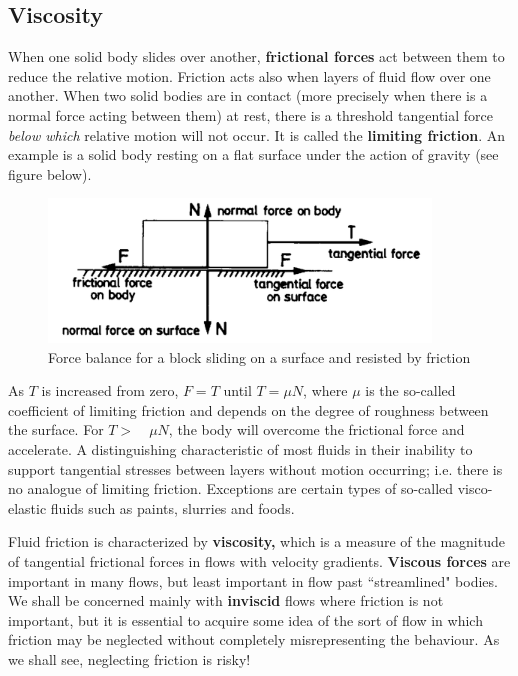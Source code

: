 \documentclass[10pt]{report}
\begin{document}
\subsection{Viscosity}

When one solid body slides over another, \textbf{frictional forces} act
between them to reduce the relative motion. Friction acts also when layers
of fluid flow over one another. When two solid bodies are in contact (more
precisely when there is a normal force acting between them) at rest, there
is a threshold tangential force \textit{below which} relative motion will not occur. It is
called the \textbf{limiting friction}. An example is a solid body resting on
a flat surface under the action of gravity (see figure below).

\begin{figure}[htbp]
\centerline{\includegraphics[width=4in]{Section5.pdf}}
\label{fig1.5}
\caption{ Force balance for a block sliding on a surface and resisted by friction }
\end{figure}

As $T$ is increased from zero, $F = T$ until $T = \mu N$, where $\mu $ is the
so-called coefficient of limiting friction and depends on the degree of roughness
between the surface. For $T > \quad \mu N$, the body will overcome the
frictional force and accelerate. A distinguishing characteristic of most
fluids in their inability to support tangential stresses between layers
without motion occurring; i.e. there is no analogue of limiting friction.
Exceptions are certain types of so-called visco-elastic fluids
such as paints, slurries and foods.


Fluid friction is characterized by \textbf{viscosity,} which is a measure of
the magnitude of tangential frictional forces in flows with velocity
gradients. \textbf{Viscous forces} are important in many flows, but least
important in flow past ``streamlined" bodies. We shall be concerned mainly
with \textbf{inviscid} flows where friction is not important, but it is
essential to acquire some idea of the sort of flow in which friction may be
neglected without completely misrepresenting the behaviour. As we shall see,
neglecting friction is risky!
\end{document}
